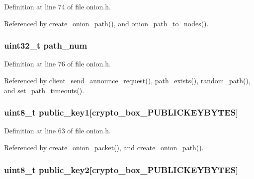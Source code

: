 Definition at line 74 of file onion.\+h.



Referenced by create\+\_\+onion\+\_\+path(), and onion\+\_\+path\+\_\+to\+\_\+nodes().

\hypertarget{struct_onion___path_a6d69f3ea5100411c3599020055b8b78c}{
\subsubsection[{path\+\_\+num}]{\setlength{\rightskip}{0pt plus 5cm}uint32\+\_\+t path\+\_\+num}}\label{struct_onion___path_a6d69f3ea5100411c3599020055b8b78c}


Definition at line 76 of file onion.\+h.



Referenced by client\+\_\+send\+\_\+announce\+\_\+request(), path\+\_\+exists(), random\+\_\+path(), and set\+\_\+path\+\_\+timeouts().

\hypertarget{struct_onion___path_a203561e286f807c2f057fc6bce17e2d8}{
\subsubsection[{public\+\_\+key1}]{\setlength{\rightskip}{0pt plus 5cm}uint8\+\_\+t public\+\_\+key1\mbox{[}crypto\+\_\+box\+\_\+\+P\+U\+B\+L\+I\+C\+K\+E\+Y\+B\+Y\+T\+E\+S\mbox{]}}}\label{struct_onion___path_a203561e286f807c2f057fc6bce17e2d8}


Definition at line 63 of file onion.\+h.



Referenced by create\+\_\+onion\+\_\+packet(), and create\+\_\+onion\+\_\+path().

\hypertarget{struct_onion___path_adb351a6df6a87dbb748077bd8081270d}{
\subsubsection[{public\+\_\+key2}]{\setlength{\rightskip}{0pt plus 5cm}uint8\+\_\+t public\+\_\+key2\mbox{[}crypto\+\_\+box\+\_\+\+P\+U\+B\+L\+I\+C\+K\+E\+Y\+B\+Y\+T\+E\+S\mbox{]}}}\label{struct_onion___path_adb351a6df6a87dbb748077bd8081270d}


